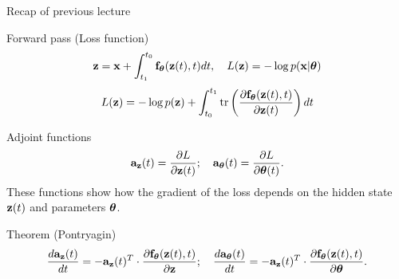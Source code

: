 

\begin{frame}
\titlepage
\end{frame}
\begin{frame}{Recap of previous lecture}
	\begin{block}{Forward pass (Loss function)}
		\vspace{-0.3cm}
		\[
			\mathbf{z} = \mathbf{x} + \int_{t_1}^{t_0} \mathbf{f}_{\boldsymbol{\theta}}(\mathbf{z}(t), t) dt, \quad L(\mathbf{z}) = - \log p(\mathbf{x} | \boldsymbol{\theta})
		\]
		\[
			L(\mathbf{z}) = - \log p(\mathbf{z}) + \int_{t_0}^{t_1} \text{tr} \left( \frac{\partial \mathbf{f}_{\boldsymbol{\theta}}(\mathbf{z}(t), t)}{\partial \mathbf{z}(t)} \right) dt
		\]
		\vspace{-0.5cm}
	\end{block}
	\begin{block}{Adjoint functions}
		\vspace{-0.4cm}
		\[
			\mathbf{a}_{\mathbf{z}}(t) = \frac{\partial L}{\partial \mathbf{z}(t)}; \quad \mathbf{a}_{\boldsymbol{\theta}}(t) = \frac{\partial L}{\partial \boldsymbol{\theta}(t)}.
		\]
		These functions show how the gradient of the loss depends on the hidden state~$\mathbf{z}(t)$ and parameters $\boldsymbol{\theta}$.
		\vspace{-0.3cm}
	\end{block}

	\begin{block}{Theorem (Pontryagin)}
		\vspace{-0.6cm}
		\[
		\frac{d \mathbf{a}_{\mathbf{z}}(t)}{dt} = - \mathbf{a}_{\mathbf{z}}(t)^T \cdot \frac{\partial \mathbf{f}_{\boldsymbol{\theta}}(\mathbf{z}(t), t)}{\partial \mathbf{z}}; \quad \frac{d \mathbf{a}_{\boldsymbol{\theta}}(t)}{dt} = - \mathbf{a}_{\mathbf{z}}(t)^T \cdot \frac{\partial \mathbf{f}_{\boldsymbol{\theta}}(\mathbf{z}(t),  t)}{\partial \boldsymbol{\theta}}.
		\]
		\vspace{-0.7cm}
	\end{block}

\end{frame}
